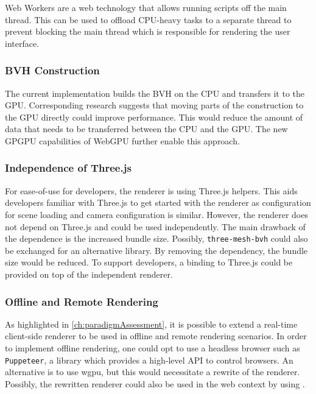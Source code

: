 Web Workers are a web technology that allows running scripts off the main thread. This can be used to offload \gls{CPU}-heavy tasks to a separate thread to prevent blocking the main thread which is responsible for rendering the user interface.

\subsubsection*{BVH Construction}
\label{sec:bvhConstructionDiscussion}

The current implementation builds the \gls{BVH} on the \gls{CPU} and transfers it to the \gls{GPU}. Corresponding research \cite{lauterbach2009GPUbvh} suggests that moving parts of the construction to the \gls{GPU} directly could improve performance. This would reduce the amount of data that needs to be transferred between the \gls{CPU} and the \gls{GPU}. The new \gls{GPGPU} capabilities of \gls{WebGPU} further enable this approach.

\subsubsection*{Independence of Three.js}

For ease-of-use for developers, the renderer is using \gls{Three.js} helpers. This aids developers familiar with \gls{Three.js} to get started with the renderer as configuration for scene loading and camera configuration is similar. However, the renderer does not depend on \gls{Three.js} and could be used independently. The main drawback of the dependence is the increased bundle size. Possibly, \texttt{three-mesh-bvh} \cite{threeMeshBvh} could also be exchanged for an alternative library. By removing the dependency, the bundle size would be reduced. To support developers, a binding to \gls{Three.js} could be provided on top of the independent renderer.

\subsubsection*{Offline and Remote Rendering}

As highlighted in \autoref{ch:paradigmAssessment}, it is possible to extend a real-time client-side renderer to be used in offline and remote rendering scenarios. In order to implement offline rendering, one could opt to use a headless browser such as \texttt{Puppeteer}, a  library which provides a high-level \gls{API} to control browsers. An alternative is to use \gls{wgpu}, but this would necessitate a rewrite of the renderer. Possibly, the rewritten renderer could also be used in the web context by using .


